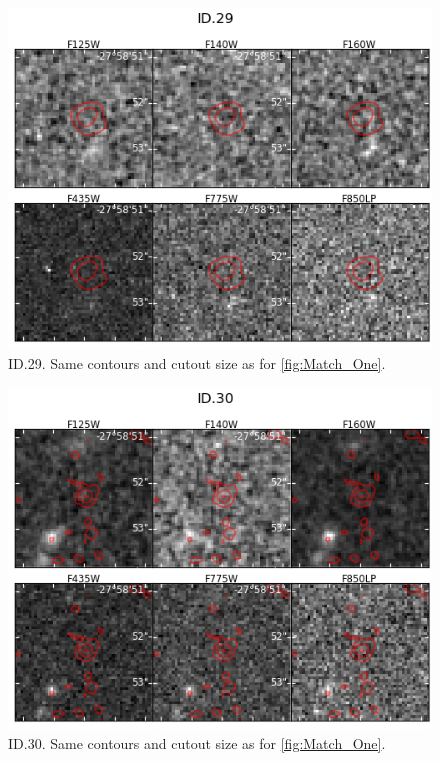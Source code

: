 \begin{figure}[tbp]
\centering \includegraphics[width=160mm]{Matched/ASPECS_Cutout_28.jpg}
\caption{ID.29. Same contours and cutout size as for \ref{fig:Match_One}.}
\label{fig:Match_Three}
\end{figure}

\begin{figure}[tbp]
\centering \includegraphics[width=160mm]{Matched/ASPECS_Cutout_29.jpg}
\caption{ID.30. Same contours and cutout size as for \ref{fig:Match_One}.}
\label{fig:Match_Three}
\end{figure}

